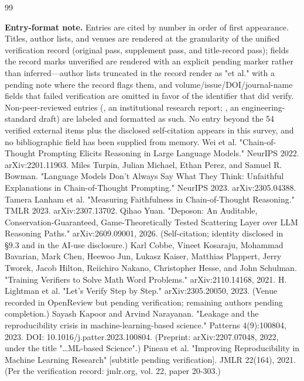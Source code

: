 \documentclass[11pt,a4paper]{article}
\begin{document}
\begin{thebibliography}{99}
\item[] {\footnotesize \textbf{Entry-format note.} Entries are cited by number in order of first appearance. Titles, author lists, and venues are rendered at the granularity of the unified verification record (original pass, supplement pass, and title-record pass); fields the record marks unverified are rendered with an explicit pending marker rather than inferred—author lists truncated in the record render as "et al." with a pending note where the record flags them, and volume/issue/DOI/journal-name fields that failed verification are omitted in favor of the identifier that did verify. Non-peer-reviewed entries (\cite{key28}, an institutional research report; \cite{key45}, an engineering-standard draft) are labeled and formatted as such. No entry beyond the 54 verified external items plus the disclosed self-citation \cite{key04} appears in this survey, and no bibliographic field has been supplied from memory.}
\vspace{0.4em}
 Wei et al. "Chain-of-Thought Prompting Elicits Reasoning in Large Language Models." NeurIPS 2022. arXiv:2201.11903.
 Miles Turpin, Julian Michael, Ethan Perez, and Samuel R. Bowman. "Language Models Don't Always Say What They Think: Unfaithful Explanations in Chain-of-Thought Prompting." NeurIPS 2023. arXiv:2305.04388.
 Tamera Lanham et al. "Measuring Faithfulness in Chain-of-Thought Reasoning." TMLR 2023. arXiv:2307.13702.
 Qihao Yuan. "Deposon: An Auditable, Conservation-Guaranteed, Game-Theoretically Tested Scattering Layer over LLM Reasoning Paths." arXiv:2609.09001, 2026. (Self-citation; identity disclosed in §9.3 and in the AI-use disclosure.)
 Karl Cobbe, Vineet Kosaraju, Mohammad Bavarian, Mark Chen, Heewoo Jun, Lukasz Kaiser, Matthias Plappert, Jerry Tworek, Jacob Hilton, Reiichiro Nakano, Christopher Hesse, and John Schulman. "Training Verifiers to Solve Math Word Problems." arXiv:2110.14168, 2021.
 H. Lightman et al. "Let's Verify Step by Step." arXiv:2305.20050, 2023. (Venue recorded in OpenReview but pending verification; remaining authors pending completion.)
 Sayash Kapoor and Arvind Narayanan. "Leakage and the reproducibility crisis in machine-learning-based science." Patterns 4(9):100804, 2023. DOI: 10.1016/j.patter.2023.100804. (Preprint: arXiv:2207.07048, 2022, under the title "…ML-based Science".)
 Pineau et al. "Improving Reproducibility in Machine Learning Research" [subtitle pending verification]. JMLR 22(164), 2021. (Per the verification record: jmlr.org, vol. 22, paper 20-303.)

\end{thebibliography}
\end{document}
